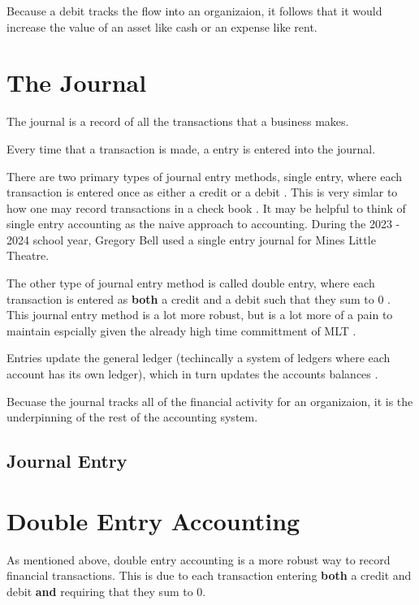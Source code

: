 Because a debit tracks the flow into an organizaion, it follows that it would increase the value of an asset like cash or an expense like rent.






\section{The Journal}

The journal is a record of all the transactions that a business makes.

Every time that a transaction is made, a entry is entered into the journal.

There are two primary types of journal entry methods, single entry, where each transaction is entered once as either a credit or a debit \cite{InvestopiaJournal}. 
This is very simlar to how one may record transactions in a check book \cite{InvestopiaJournal}. It may be helpful to think of single entry accounting as the naive approach to accounting.
During the 2023 - 2024 school year, Gregory Bell used a single entry journal for Mines Little Theatre.

The other type of journal entry method is called double entry, where each transaction is entered as \textbf{both} a credit and a debit such that they sum to 0 \cite{InvestopiaJournal}.
This journal entry method is a lot more robust, but is a lot more of a pain to maintain espcially given the already high time committment of MLT \cite{InvestopiaJournal, NetsuiteJournal}.

Entries update the general ledger (techincally a system of ledgers where each account has its own ledger), which in turn updates the accounts balances \cite{NetsuiteJournal}.

Becuase the journal tracks all of the financial activity for an organizaion, it is the underpinning of the rest of the accounting system.

\subsection{Journal Entry}




\section{Double Entry Accounting}

As mentioned above, double entry accounting is a more robust way to record financial transactions. This is due to each transaction entering \textbf{both} a credit and debit \textbf{and} requiring that they sum to 0.

